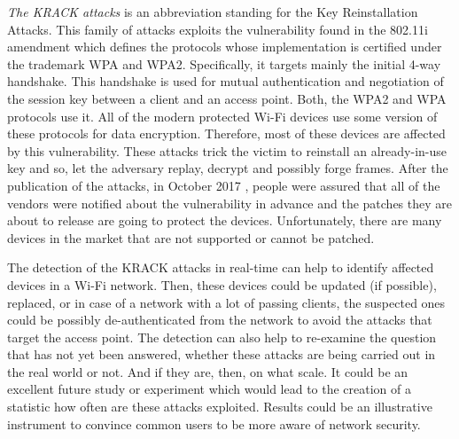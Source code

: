 \textit{The KRACK attacks} is an abbreviation standing for the Key Reinstallation Attacks. This family of attacks exploits the vulnerability found in the 802.11i amendment which defines the protocols whose implementation is  certified under the trademark WPA and WPA2. Specifically, it targets mainly the initial 4-way handshake. This handshake is used for mutual authentication and negotiation of the session key between a client and an access point. Both, the WPA2 and WPA protocols use it. All of the modern protected \mbox{Wi-Fi} devices use some version of these protocols for data encryption. Therefore, most of these devices are affected by this vulnerability. These attacks trick the victim to reinstall an already-in-use key and so, let the adversary replay, decrypt and possibly forge frames. After the publication of the attacks, in October 2017 \cite{VA17}, people were assured that all of the vendors were notified about the vulnerability in advance and the patches they are about to release are going to protect the devices. Unfortunately, there are many devices in the market that are not supported or cannot be patched.


The detection of the KRACK attacks in real-time can help to identify affected devices in a Wi-Fi network. Then, these devices could be updated (if possible), replaced, or in case of a network with a lot of passing clients, the suspected ones could be possibly de-authenticated from the network to avoid the attacks that target the access point. The detection can also help to re-examine the question that has not yet been answered, whether these attacks are being carried out in the real world or not. And if they are, then, on what scale. It could be an excellent future study or experiment which would lead to the creation of a statistic how often are these attacks exploited. Results could be an illustrative instrument to convince common users to be more aware of network security. 



